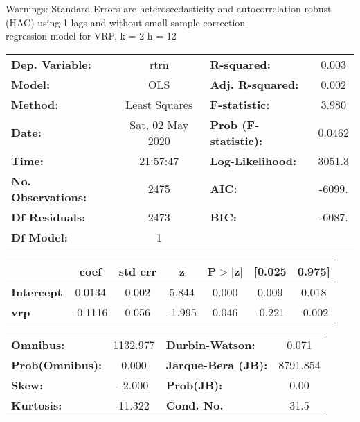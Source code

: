 Warnings: \newline
 [1] Standard Errors are heteroscedasticity and autocorrelation robust (HAC) using 1 lags and without small sample correction\\ 

regression model for VRP, k = 2 h = 12\begin{center}
\begin{tabular}{lclc}
\toprule
\textbf{Dep. Variable:}    &       rtrn       & \textbf{  R-squared:         } &     0.003   \\
\textbf{Model:}            &       OLS        & \textbf{  Adj. R-squared:    } &     0.002   \\
\textbf{Method:}           &  Least Squares   & \textbf{  F-statistic:       } &     3.980   \\
\textbf{Date:}             & Sat, 02 May 2020 & \textbf{  Prob (F-statistic):} &   0.0462    \\
\textbf{Time:}             &     21:57:47     & \textbf{  Log-Likelihood:    } &    3051.3   \\
\textbf{No. Observations:} &        2475      & \textbf{  AIC:               } &    -6099.   \\
\textbf{Df Residuals:}     &        2473      & \textbf{  BIC:               } &    -6087.   \\
\textbf{Df Model:}         &           1      & \textbf{                     } &             \\
\bottomrule
\end{tabular}
\begin{tabular}{lcccccc}
                   & \textbf{coef} & \textbf{std err} & \textbf{z} & \textbf{P$> |$z$|$} & \textbf{[0.025} & \textbf{0.975]}  \\
\midrule
\textbf{Intercept} &       0.0134  &        0.002     &     5.844  &         0.000        &        0.009    &        0.018     \\
\textbf{vrp}       &      -0.1116  &        0.056     &    -1.995  &         0.046        &       -0.221    &       -0.002     \\
\bottomrule
\end{tabular}
\begin{tabular}{lclc}
\textbf{Omnibus:}       & 1132.977 & \textbf{  Durbin-Watson:     } &    0.071  \\
\textbf{Prob(Omnibus):} &   0.000  & \textbf{  Jarque-Bera (JB):  } & 8791.854  \\
\textbf{Skew:}          &  -2.000  & \textbf{  Prob(JB):          } &     0.00  \\
\textbf{Kurtosis:}      &  11.322  & \textbf{  Cond. No.          } &     31.5  \\
\bottomrule
\end{tabular}
\end{center}

